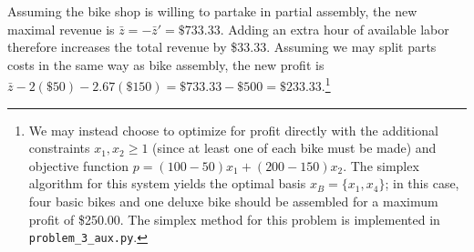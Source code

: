 \begin{solution}
  Assuming the bike shop is willing to partake in partial assembly, the new maximal revenue is 
  $\bar{z} = -\bar{z}' = \$733.33$. Adding an extra hour of available labor therefore increases the total revenue by 
  \$33.33. Assuming we may split parts costs in the same way as bike assembly, the new profit is 
  $\bar{z} - 2(\$50) - 2.67(\$150) = \$733.33 - \$500 = \$233.33$.\footnote{
    We may instead choose to optimize for profit directly with the additional constraints $x_1, x_2 \ge 1$ (since at 
    least one of each bike must be made) and objective function $p = (100 - 50)x_1 + (200 - 150)x_2$. The simplex 
    algorithm for this system yields the optimal basis $x_B = \{ x_1, x_4 \}$; in this case, four basic bikes and one 
    deluxe bike should be assembled for a maximum profit of \$250.00. The simplex method for this problem is implemented
    in \texttt{problem\_3\_aux.py}.
  }

\end{solution}